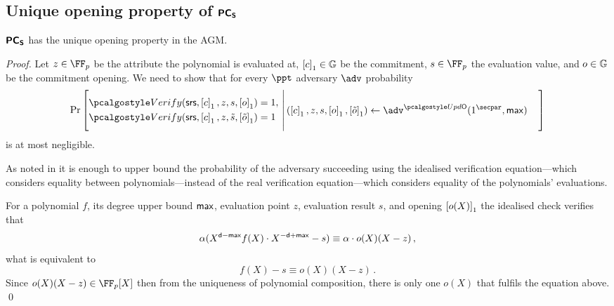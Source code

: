 \subsection{Unique opening property of $\bm{\mathsf{PC}}_{\bm{\mathsf{S}}}$}
\begin{lemma}
\label{lem:pcoms_unique_op}
$\bm{\mathsf{PC}}_{\bm{\mathsf{S}}}$ has the unique opening property in the AGM. 
\end{lemma}
\begin{proof}
Let 
$z \in \FF_p$ be the attribute the polynomial is evaluated at,
$\left[c\right]_{1} \in \mathbb{G}$ be the commitment,  
$s \in \FF_p$ the evaluation value, and 
$o \in \mathbb{G}$ be the commitment opening. 
We need to show that for every $\ppt$ adversary $\adv$ probability
\[
  \Pr \left[
    \begin{aligned}
      & \verify(\srs, \gone{c}, z, s, \gone{o}) = 1, \\
      & \verify(\srs, \gone{c}, z, \tilde{s}, \gone{\tilde{o}}) = 1
    \end{aligned}
    \,\left|\, \vphantom{\begin{aligned}
          & \verify(\srs, \gone{c}, z, s, \gone{o}),\\
          & \verify(\srs, \gone{c}, z, s, \gone{\tilde{o}}) \\
          &o \neq \tilde{o})
		\end{aligned}}
      \begin{aligned}
        & (\gone{c}, z, s, \gone{o}, \gone{\tilde{o}}) \gets \adv^{\initU}(1^\secpar, \maxdeg)
      \end{aligned}
    \right.\right]
\]
is at most negligible.

As noted in \cite[Lemma 2.2]{EPRINT:GabWilCio19} it is enough to upper bound the
probability of the adversary succeeding using the idealised verification
equation---which considers equality between polynomials---instead of the real
verification equation---which considers equality of the polynomials' evaluations.

For a polynomial $f$, its degree upper bound $\mathsf{max}$, evaluation point $z$,
evaluation result $s$, and opening $\left[o(X)\right]_{1}$ the idealised check verifies that
\begin{equation}
  \alpha (X^{\mathsf{d} - \mathsf{max}}f(X) \cdot X^{-\mathsf{d} + \mathsf{max}} -  s) \equiv \alpha \cdot o(X) (X - z)\,,
\end{equation}
what is equivalent to 
\begin{equation}
	f(X) -  s \equiv o(X) (X - z)\,.
	\label{eq:pcoms_idealised_check}
\end{equation}
Since $o(X)(X - z) \in \FF_p[X]$ then from the uniqueness of polynomial
composition, there is only one $o(X)$ that fulfils the equation above.
\qed
\end{proof}


